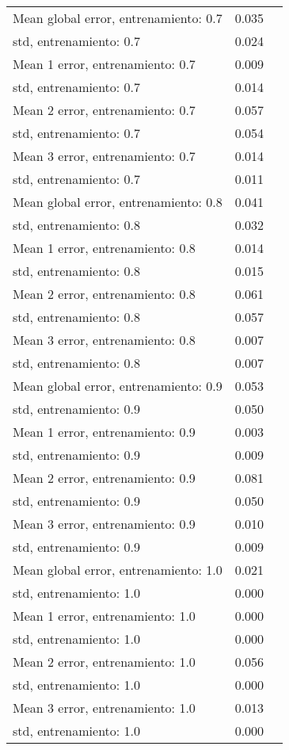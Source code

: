 \begin{longtable}{p{4cm}|p{1.5cm}|p{1.5cm}}
Mean global error, entrenamiento: 0.7 &              0.035 \\
std, entrenamiento: 0.7               &              0.024 \\
Mean 1 error, entrenamiento: 0.7      &              0.009 \\
std, entrenamiento: 0.7               &              0.014 \\
Mean 2 error, entrenamiento: 0.7      &              0.057 \\
std, entrenamiento: 0.7               &              0.054 \\
Mean 3 error, entrenamiento: 0.7      &              0.014 \\
std, entrenamiento: 0.7               &              0.011 \\
Mean global error, entrenamiento: 0.8 &              0.041 \\
std, entrenamiento: 0.8               &              0.032 \\
Mean 1 error, entrenamiento: 0.8      &              0.014 \\
std, entrenamiento: 0.8               &              0.015 \\
Mean 2 error, entrenamiento: 0.8      &              0.061 \\
std, entrenamiento: 0.8               &              0.057 \\
Mean 3 error, entrenamiento: 0.8      &              0.007 \\
std, entrenamiento: 0.8               &              0.007 \\
Mean global error, entrenamiento: 0.9 &              0.053 \\
std, entrenamiento: 0.9               &              0.050 \\
Mean 1 error, entrenamiento: 0.9      &              0.003 \\
std, entrenamiento: 0.9               &              0.009 \\
Mean 2 error, entrenamiento: 0.9      &              0.081 \\
std, entrenamiento: 0.9               &              0.050 \\
Mean 3 error, entrenamiento: 0.9      &              0.010 \\
std, entrenamiento: 0.9               &              0.009 \\
Mean global error, entrenamiento: 1.0 &              0.021 \\
std, entrenamiento: 1.0               &              0.000 \\
Mean 1 error, entrenamiento: 1.0      &              0.000 \\
std, entrenamiento: 1.0               &              0.000 \\
Mean 2 error, entrenamiento: 1.0      &              0.056 \\
std, entrenamiento: 1.0               &              0.000 \\
Mean 3 error, entrenamiento: 1.0      &              0.013 \\
std, entrenamiento: 1.0               &              0.000 \\
\end{longtable}
